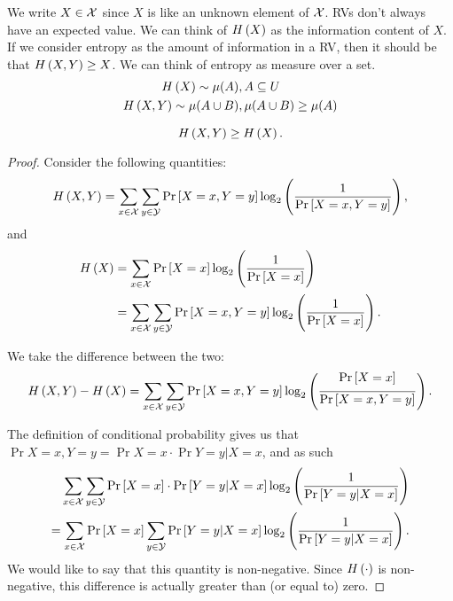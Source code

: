 We write $X \in \mathcal{X}$ since $X$ is like an unknown element of $\mathcal{X}$.
\acp{RV} don't always have an expected value.
We can think of $H\left({X}\right)$ as the information content of $X$.
If we consider entropy as the amount of information in a \ac{RV}, then it should be that $H\left({X,Y}\right) \ge X$.
We can think of entropy as  measure over a set.
\begin{align*}
	H\left({X}\right) \sim \mu(A), & \, A \subseteq U
	\\
	H\left({X,Y}\right) \sim \mu(A \cup B), & \, \mu(A \cup B) \geq \mu(A)
\end{align*}

\begin{prop}
	\begin{equation*}
		H\left({X,Y}\right) \ge H\left({X}\right).   
	\end{equation*}
\end{prop}

\begin{proof}
	Consider the following quantities:
	\begin{equation*}
		H\left({X,Y}\right)
		=
		\sum_{x \in \mathcal{X}} \sum_{y \in \mathcal{Y}} \mathop{\mathrm{Pr}}\limits_{} \left[ {X = x, Y = y} \right]
		\log_2 \left( \frac{1}{\mathop{\mathrm{Pr}}\limits_{} \left[ {X = x, Y = y} \right]} \right),
	\end{equation*}
	and
	\begin{align*}
		H\left({X}\right)
		& =
		\sum_{x \in \mathcal{X}} \mathop{\mathrm{Pr}}\limits_{} \left[ {X = x} \right] \log_2 \left( \frac{1}{\mathop{\mathrm{Pr}}\limits_{} \left[ {X=x} \right]} \right)
		\\
		& =
		\sum_{x \in \mathcal{X}} \sum_{y \in \mathcal{Y}} \mathop{\mathrm{Pr}}\limits_{} \left[ {X = x, Y = y} \right]
		\log_2 \left( \frac{1}{\mathop{\mathrm{Pr}}\limits_{} \left[ {X = x} \right]} \right).
	\end{align*} 

	We take the difference between the two:
	\begin{equation*}
		H\left({X,Y}\right) - H\left({X}\right)
		=
		\sum_{x \in \mathcal{X}} \sum_{y \in \mathcal{Y}}
		\mathop{\mathrm{Pr}}\limits_{} \left[ {X = x, Y = y} \right]
		\log_2 \left( \frac{\mathop{\mathrm{Pr}}\limits_{} \left[ {X = x} \right]}{\mathop{\mathrm{Pr}}\limits_{} \left[ {X = x, Y = y} \right]} \right).
	\end{equation*}

	The definition of conditional probability gives us that $\Pr{X = x, Y = y} = \Pr{X = x} \cdot \Pr{Y = y | X = x}$, and as such
	\begin{align*}
		\sum_{x \in \mathcal{X}} \sum_{y \in \mathcal{Y}} \mathop{\mathrm{Pr}}\limits_{} \left[ {X = x} \right] \cdot \mathop{\mathrm{Pr}}\limits_{} \left[ {Y = y | X = x} \right]
		\log_2 \left( \frac{1}{\mathop{\mathrm{Pr}}\limits_{} \left[ {Y = y | X = x} \right]} \right)
		\\
		=
		\sum_{x \in \mathcal{X}} \mathop{\mathrm{Pr}}\limits_{} \left[ {X = x} \right] \sum_{y \in \mathcal{Y}} \mathop{\mathrm{Pr}}\limits_{} \left[ {Y = y | X = x} \right]
		\log_2 \left( \frac{1}{\mathop{\mathrm{Pr}}\limits_{} \left[ {Y = y | X = x} \right]} \right).
	\end{align*}
	We would like to say that this quantity is non-negative.
	Since $H\left({\cdot}\right)$ is non-negative, this difference is actually greater than (or equal to) zero.
\end{proof}

